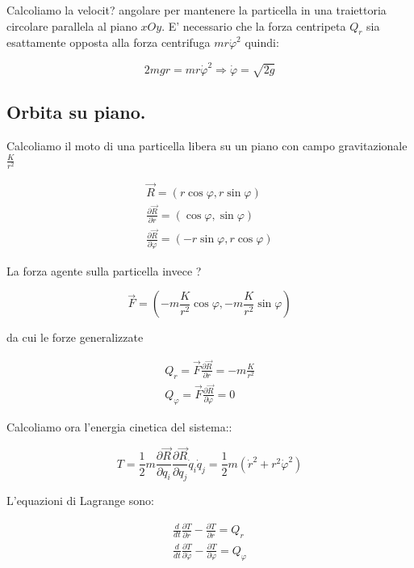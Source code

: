 \documentclass[a4paper,twoside]{article}
\begin{document}
Calcoliamo la velocit? angolare per mantenere la particella in una traiettoria circolare parallela al piano
$xOy$. E' necessario che la forza centripeta $Q_r$ sia esattamente opposta alla forza centrifuga
$mr\dot \varphi^2$ quindi:

\begin{equation}
2mgr=mr\dot\varphi^2 \Rightarrow \dot\varphi=\sqrt {2g}
\end{equation}


\subsection{Orbita su piano.}

Calcoliamo il moto di una particella libera su un piano con campo gravitazionale $\frac{K}{r^2}$

\begin{eqnarray}
\vec R=(r \cos \varphi, r \sin \varphi)
\\
\frac{\partial \vec R}{\partial r }=(\cos \varphi,\sin \varphi)
\\
\frac{\partial \vec R}{\partial\varphi }=(-r \sin \varphi, r\cos \varphi)
\end{eqnarray}

La forza agente sulla particella invece ?

\begin{equation}
\vec F = (-m\frac{K}{r^2}\cos\varphi, -m\frac{K}{r^2}\sin\varphi)
\end{equation}

da cui le forze generalizzate

\begin{eqnarray}
Q_r=\vec F \frac{\partial\vec R}{\partial r}=-m\frac{K}{r^2}
\\
Q_\varphi=\vec F \frac{\partial\vec R}{\partial \varphi}=0
\end{eqnarray}

Calcoliamo ora l'energia cinetica del sistema::

\begin{equation}
T=\frac{1}{2} m \frac{\partial \vec R}{\partial q_i}\frac{\partial \vec R}{\partial q_j} \dot q_i \dot q_j
=\frac{1}{2} m (\dot r^2+r^2\dot\varphi ^2)
\end{equation}

L'equazioni di Lagrange sono:

\begin{eqnarray}
\frac{d}{dt}\frac{\partial T}{\partial\dot r}-\frac{\partial T}{\partial r} = Q_r
\\
\frac{d}{dt}\frac{\partial T}{\partial\dot\varphi}-\frac{\partial T}{\partial\varphi} = Q_\varphi
\end{eqnarray}
\end{document}

